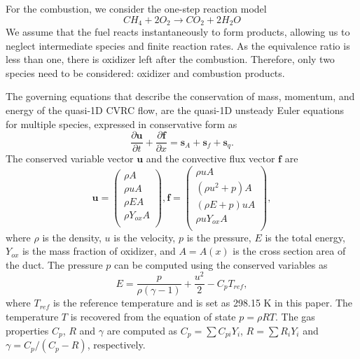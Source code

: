For the combustion, we consider the one-step reaction model
\begin{equation*}\label{eq:combustion}
CH_4 + 2O_2 \rightarrow CO_2 + 2H_2O
\end{equation*}
We assume that the fuel reacts instantaneously to form products, allowing us to neglect intermediate species and finite reaction rates. As the equivalence ratio is less than one, there is oxidizer left after the combustion. Therefore, only two species need to be considered: oxidizer and combustion products.


The governing equations that describe the conservation of mass, momentum, and energy of the quasi-1D CVRC flow, are the quasi-1D unsteady Euler equations for multiple species, expressed in conservative form as
\begin{equation*}\label{eq:quasi-1D-equation}
\frac{\partial \mathbf{u}}{\partial t} + \frac{\partial \mathbf{f}}{\partial x} = \mathbf{s}_A + \mathbf{s}_f + \mathbf{s}_q.
\end{equation*}
The conserved variable vector $\mathbf{u}$ and the convective flux vector $\mathbf{f}$ are
\begin{equation*}\label{eq:CVRC-u-f}
\mathbf{u}= \left( \begin{gathered}
\rho A  \\
\rho uA  \\
\rho EA  \\
\rho Y_{ox} A \\
\end{gathered} \right), 
\mathbf{f} = \left( \begin{gathered}
\rho uA  \\
\left(\rho u^2 + p\right)A  \\
\left(\rho E + p\right)uA  \\
\rho uY_{ox} A \\
\end{gathered} \right),
\end{equation*}
where $\rho$ is the density, $u$ is the velocity, $p$ is the pressure, $E$ is the total energy, $Y_{ox}$ is the mass fraction of oxidizer, and $A=A(x)$ is the cross section area of the duct. The pressure $p$ can be computed using the conserved variables as
\begin{equation*}\label{eq:total-engery}
E = \frac{p}{\rho (\gamma - 1)} + \frac{u^2}{2} - C_p T_{ref},
\end{equation*}
where $T_{ref}$ is the reference temperature and is set as 298.15 K in this paper. The temperature $T$ is recovered from the equation of state $p = \rho R T$. The gas properties  $C_p$, $R$ and $\gamma$ are computed as $C_p= \sum C_{pi}Y_i$, $R=\sum R_iY_i$ and $ \gamma= C_p/(C_p-R)$, respectively. 

